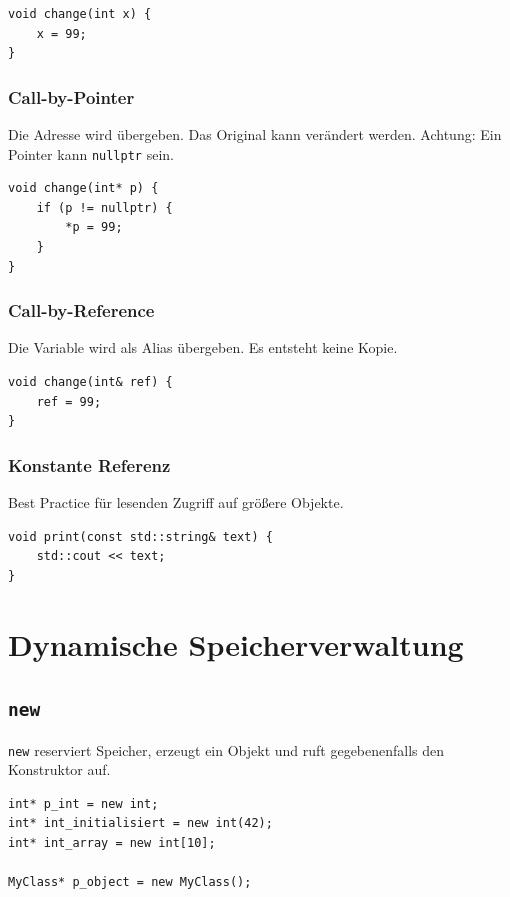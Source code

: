 \documentclass[11pt,a4paper]{article}
\newcommand{\code}[1]{\texttt{#1}}
\begin{document}
\begin{lstlisting}[caption={Call-by-Value}]
void change(int x) {
    x = 99;
}
\end{lstlisting}

\subsubsection{Call-by-Pointer}
Die Adresse wird übergeben. Das Original kann verändert werden. Achtung: Ein Pointer kann \code{nullptr} sein.

\begin{lstlisting}[caption={Call-by-Pointer}]
void change(int* p) {
    if (p != nullptr) {
        *p = 99;
    }
}
\end{lstlisting}

\subsubsection{Call-by-Reference}
Die Variable wird als Alias übergeben. Es entsteht keine Kopie.

\begin{lstlisting}[caption={Call-by-Reference}]
void change(int& ref) {
    ref = 99;
}
\end{lstlisting}

\subsubsection{Konstante Referenz}
Best Practice für lesenden Zugriff auf größere Objekte.

\begin{lstlisting}[caption={Konstante Referenz}]
void print(const std::string& text) {
    std::cout << text;
}
\end{lstlisting}

\section{Dynamische Speicherverwaltung}

\subsection{\code{new}}
\code{new} reserviert Speicher, erzeugt ein Objekt und ruft gegebenenfalls den Konstruktor auf.

\begin{lstlisting}[caption={Speicher mit new reservieren}]
int* p_int = new int;
int* int_initialisiert = new int(42);
int* int_array = new int[10];

MyClass* p_object = new MyClass();
\end{lstlisting}
\end{document}
